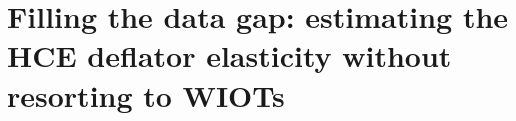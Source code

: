 \documentclass[11pt,a4paper]{paper} %
\begin{document}
%
%
%
%
%

\section{Filling the data gap: estimating the HCE deflator elasticity without resorting to WIOTs}
\label{sec:extrapo}
\end{document}
